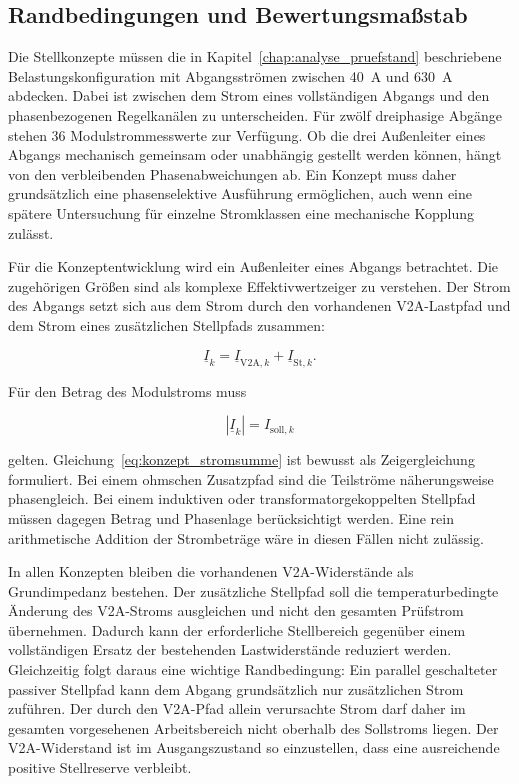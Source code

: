 \subsection{Randbedingungen und Bewertungsmaßstab}
\label{sec:randbedingungen_bewertung_stellkonzepte}

Die Stellkonzepte müssen die in Kapitel~\ref{chap:analyse_pruefstand}
beschriebene Belastungs\-konfiguration mit Abgangs\-strömen zwischen
\SI{40}{\ampere} und \SI{630}{\ampere} abdecken. Dabei ist zwischen dem
Strom eines vollständigen Abgangs und den phasenbezogenen Regelkanälen zu
unterscheiden. Für zwölf dreiphasige Abgänge stehen 36 Modulstrommesswerte zur
Verfügung. Ob die drei Außenleiter eines Abgangs mechanisch gemeinsam oder
unabhängig gestellt werden können, hängt von den verbleibenden
Phasen\-abweichungen ab. Ein Konzept muss daher grundsätzlich eine
phasen\-selektive Ausführung ermöglichen, auch wenn eine spätere Untersuchung
für einzelne Stromklassen eine mechanische Kopplung zulässt.

Für die Konzeptentwicklung wird ein Außenleiter eines Abgangs betrachtet. Die
zugehörigen Größen sind als komplexe Effektivwertzeiger zu verstehen. Der
Strom des Abgangs setzt sich aus dem Strom durch den vorhandenen
V2A-Lastpfad und dem Strom eines zusätzlichen Stellpfads zusammen:

\begin{equation}
    \underline{I}_{k}
    =
    \underline{I}_{\mathrm{V2A},k}
    +
    \underline{I}_{\mathrm{St},k}.
    \label{eq:konzept_stromsumme}
\end{equation}

Für den Betrag des Modulstroms muss

\begin{equation}
    \left|\underline{I}_{k}\right|
    =
    I_{\mathrm{soll},k}
    \label{eq:konzept_sollstrombedingung}
\end{equation}

gelten. Gleichung~\ref{eq:konzept_stromsumme} ist bewusst als Zeigergleichung
formuliert. Bei einem ohmschen Zusatzpfad sind die Teilströme näherungsweise
phasengleich. Bei einem induktiven oder transformatorgekoppelten Stellpfad
müssen dagegen Betrag und Phasenlage berücksichtigt werden. Eine rein
arithmetische Addition der Strombeträge wäre in diesen Fällen nicht zulässig.

In allen Konzepten bleiben die vorhandenen V2A-Widerstände als Grundimpedanz
bestehen. Der zusätzliche Stellpfad soll die
temperatur\-bedingte Änderung des V2A-Stroms ausgleichen und nicht den gesamten
Prüfstrom übernehmen. Dadurch kann der erforderliche Stell\-bereich gegenüber
einem vollständigen Ersatz der bestehenden Last\-widerstände reduziert werden.
Gleichzeitig folgt daraus eine wichtige Rand\-bedingung: Ein parallel
geschalteter passiver Stellpfad kann dem Abgang grundsätzlich nur zusätz\-lichen
Strom zuführen. Der durch den V2A-Pfad allein verursachte Strom darf daher im
gesamten vorgesehenen Arbeits\-bereich nicht oberhalb des Sollstroms liegen.
Der V2A-Widerstand ist im Ausgangs\-zustand so einzustellen, dass eine
ausreichende positive Stell\-reserve verbleibt.


